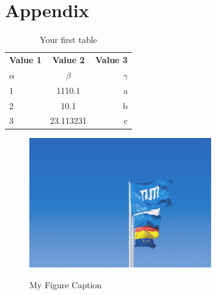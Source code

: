 \chapter{Appendix}

\begin{table}[h!]
  \begin{center}
    \caption{Your first table}
    \label{tab:table1}
    \begin{tabular}{l|c|r} %
      \textbf{Value 1} & \textbf{Value 2} & \textbf{Value 3}\\
      $\alpha$ & $\beta$ & $\gamma$ \\
      \hline
      1 & 1110.1 & a\\
      2 & 10.1 & b\\
      3 & 23.113231 & c\\
    \end{tabular}
  \end{center}
\end{table}

\newpage

\begin{figure}[h]
    \centering
    \caption{My Figure Caption}
    \includegraphics[width=0.7\textwidth]{tum-resources/images/Universitaet_Flaggen.jpg}
    \label{fig:ourFigure}
\end{figure}